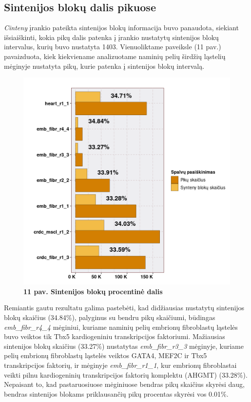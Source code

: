 \documentclass[12pt]{article}
\begin{document}
\newpage

\subsection{Sintenijos blokų dalis pikuose}
\emph{Cinteny} įrankio pateikta sintenijos blokų informacija buvo panaudota,
siekiant išsiaiškinti, kokia pikų dalis patenka į įrankio nustatytų sintenijos
blokų intervalus, kurių buvo nustatyta 1403. Vienuoliktame paveiksle (11 pav.)
pavaizduota, kiek kiekviename analizuotame naminių pelių širdžių ląstelių
mėginyje nustatyta pikų, kurie patenka į sintenijos blokų intervalą.

\begin{figure}[htb]
    \begin{center}
        \includegraphics[width=0.7\linewidth]{../Figures/Synteny_blocks_peaks.png}
        \vspace{-2\baselineskip}
        \caption*{\small\textbf{11 pav. Sintenijos blokų procentinė dalis}}
        \label{fig:birds}
    \end{center}
\end{figure}

Remiantis gautu rezultatu galima pastebėti, kad didžiausias nustatytų sintenijos
blokų skaičius (34.84\%), palyginus su bendru pikų skaičiumi, būdingas
\emph{emb\_fibr\_r4\_4} mėginiui, kuriame naminių pelių embrionų fibroblastų
ląstelės buvo veiktos tik Tbx5 kardiogeniniu transkripcijos faktoriumi.
Mažiausias sintenijos blokų skaičius (33.27\%) nustatytas
\emph{emb\_fibr\_r3\_3} mėginyje, kuriame pelių embrionų fibroblastų ląstelės
veiktos GATA4, MEF2C ir Tbx5 transkripcijos faktorių, ir mėginyje
\emph{emb\_fibr\_r1\_1}, kur embrionų fibroblastai veikti pilnu kardiogeninių
trans\-krip\-ci\-jos faktorių komplektu (AHGMT) (33.28\%). Nepaisant to, kad
pastaruosiuose mėginiuose bendras pikų skaičius skyrėsi daug, bendras sintenijos
blokams priklausančių pikų procentas skyrėsi vos 0.01\%.
\end{document}
